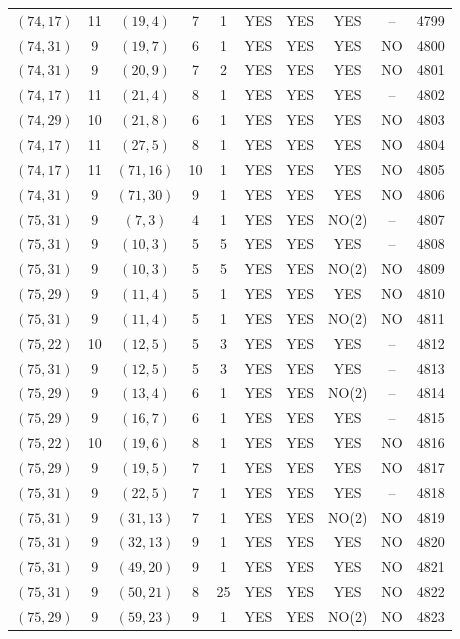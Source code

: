 \begin{longtable}{|c|c|c|c|c|c|c|c|c|c|}
$(74, 17)$ & 11 & $(19, 4)$ & 7 & 1 & YES & YES & YES & -- & 4799\\
$(74, 31)$ & 9 & $(19, 7)$ & 6 & 1 & YES & YES & YES & NO & 4800\\
$(74, 31)$ & 9 & $(20, 9)$ & 7 & 2 & YES & YES & YES & NO & 4801\\
$(74, 17)$ & 11 & $(21, 4)$ & 8 & 1 & YES & YES & YES & -- & 4802\\
$(74, 29)$ & 10 & $(21, 8)$ & 6 & 1 & YES & YES & YES & NO & 4803\\
$(74, 17)$ & 11 & $(27, 5)$ & 8 & 1 & YES & YES & YES & NO & 4804\\
$(74, 17)$ & 11 & $(71, 16)$ & 10 & 1 & YES & YES & YES & NO & 4805\\
$(74, 31)$ & 9 & $(71, 30)$ & 9 & 1 & YES & YES & YES & NO & 4806\\
$(75, 31)$ & 9 & $(7, 3)$ & 4 & 1 & YES & YES & NO(2) & -- & 4807\\
$(75, 31)$ & 9 & $(10, 3)$ & 5 & 5 & YES & YES & YES & -- & 4808\\
$(75, 31)$ & 9 & $(10, 3)$ & 5 & 5 & YES & YES & NO(2) & NO & 4809\\
$(75, 29)$ & 9 & $(11, 4)$ & 5 & 1 & YES & YES & YES & NO & 4810\\
$(75, 31)$ & 9 & $(11, 4)$ & 5 & 1 & YES & YES & NO(2) & NO & 4811\\
$(75, 22)$ & 10 & $(12, 5)$ & 5 & 3 & YES & YES & YES & -- & 4812\\
$(75, 31)$ & 9 & $(12, 5)$ & 5 & 3 & YES & YES & YES & -- & 4813\\
$(75, 29)$ & 9 & $(13, 4)$ & 6 & 1 & YES & YES & NO(2) & -- & 4814\\
$(75, 29)$ & 9 & $(16, 7)$ & 6 & 1 & YES & YES & YES & -- & 4815\\
$(75, 22)$ & 10 & $(19, 6)$ & 8 & 1 & YES & YES & YES & NO & 4816\\
$(75, 29)$ & 9 & $(19, 5)$ & 7 & 1 & YES & YES & YES & NO & 4817\\
$(75, 31)$ & 9 & $(22, 5)$ & 7 & 1 & YES & YES & YES & -- & 4818\\
$(75, 31)$ & 9 & $(31, 13)$ & 7 & 1 & YES & YES & NO(2) & NO & 4819\\
$(75, 31)$ & 9 & $(32, 13)$ & 9 & 1 & YES & YES & YES & NO & 4820\\
$(75, 31)$ & 9 & $(49, 20)$ & 9 & 1 & YES & YES & YES & NO & 4821\\
$(75, 31)$ & 9 & $(50, 21)$ & 8 & 25 & YES & YES & YES & NO & 4822\\
$(75, 29)$ & 9 & $(59, 23)$ & 9 & 1 & YES & YES & NO(2) & NO & 4823\\

\end{longtable}
